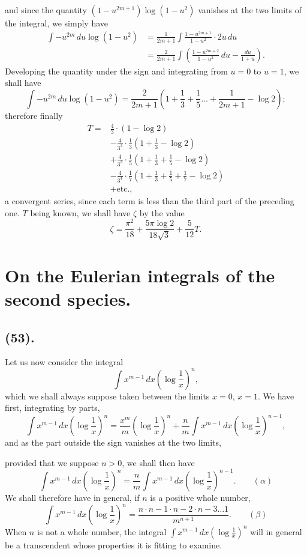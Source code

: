 \documentclass{article}
\begin{document}
and since the quantity $(1-u^{2m+1})\log(1-u^{2})$ vanishes at the two limits of the integral, we simply have
\[ \begin{aligned} \int-u^{2m}\,du\log(1-u^{2})&=\frac{1}{2m+1}\int\frac{1-u^{2m+1}}{1-u^{2}}\cdot 2u\,du\\ &=\frac{2}{2m+1}\int\left(\frac{1-u^{2m+2}}{1-u^{2}}\,du-\frac{du}{1+u}\right). \end{aligned} \]
Developing the quantity under the sign and integrating from $u=0$ to $u=1$, we shall have
\[ \int-u^{2m}\,du\log(1-u^{2})=\frac{2}{2m+1}\left(1+\frac{1}{3}+\frac{1}{5}\ldots+\frac{1}{2m+1}-\log 2\right); \]
therefore finally
\[ \begin{aligned} T={}&\frac{4}{3}\cdot(1-\log 2)\\ &-\frac{4}{3^{2}}\cdot\frac{1}{3}\left(1+\frac{1}{3}-\log 2\right)\\ &+\frac{4}{3^{3}}\cdot\frac{1}{5}\left(1+\frac{1}{3}+\frac{1}{5}-\log 2\right)\\ &-\frac{4}{3^{4}}\cdot\frac{1}{7}\left(1+\frac{1}{3}+\frac{1}{5}+\frac{1}{7}-\log 2\right)\\ &+\text{etc.}, \end{aligned} \]
a convergent series, since each term is less than the third part of the preceding one. $T$ being known, we shall have $\zeta$ by the value
\[ \zeta=\frac{\pi^{2}}{18}+\frac{5\pi\log 2}{18\sqrt{3}}+\frac{5}{12}T. \]

\section*{On the Eulerian integrals of the second species.}

\subsection*{(53).}

Let us now consider the integral
\[ \int x^{m-1}\,dx\left(\log\frac{1}{x}\right)^{n}, \]
which we shall always suppose taken between the limits $x=0$, $x=1$. We have first, integrating by parts,
\[ \int x^{m-1}\,dx\left(\log\frac{1}{x}\right)^{n}=\frac{x^{m}}{m}\left(\log\frac{1}{x}\right)^{n}+\frac{n}{m}\int x^{m-1}\,dx\left(\log\frac{1}{x}\right)^{n-1}, \]
and as the part outside the sign vanishes at the two limits,

provided that we suppose $n>0$, we shall then have
\[ \int x^{m-1}\,dx\left(\log\frac{1}{x}\right)^{n}=\frac{n}{m}\int x^{m-1}\,dx\left(\log\frac{1}{x}\right)^{n-1}.\qquad(\alpha) \]
We shall therefore have in general, if $n$ is a positive whole number,
\[ \int x^{m-1}\,dx\left(\log\frac{1}{x}\right)^{n}=\frac{n\cdot n-1\cdot n-2\cdot n-3\ldots 1}{m^{n+1}}.\qquad(\beta) \]
When $n$ is not a whole number, the integral $\displaystyle\int x^{m-1}\,dx\left(\log\frac{1}{x}\right)^{n}$ will in general be a transcendent whose properties it is fitting to examine.
\end{document}
